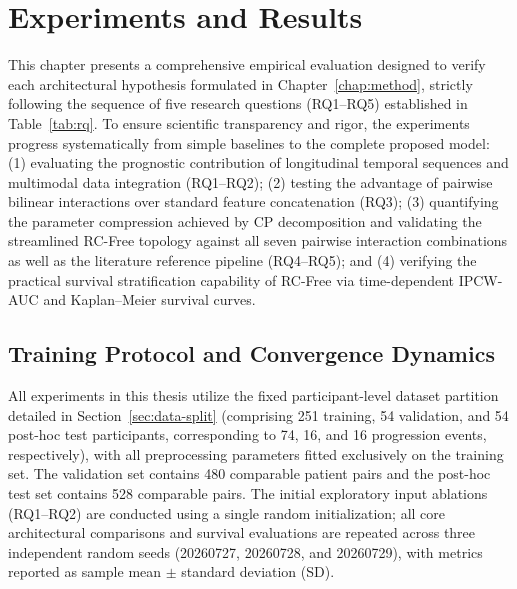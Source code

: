 \chapter{Experiments and Results}
\label{chap:results}

This chapter presents a comprehensive empirical evaluation designed to verify each architectural hypothesis formulated in Chapter~\ref{chap:method}, strictly following the sequence of five research questions (RQ1--RQ5) established in Table~\ref{tab:rq}. To ensure scientific transparency and rigor, the experiments progress systematically from simple baselines to the complete proposed model: (1) evaluating the prognostic contribution of longitudinal temporal sequences and multimodal data integration (RQ1--RQ2); (2) testing the advantage of pairwise bilinear interactions over standard feature concatenation (RQ3); (3) quantifying the parameter compression achieved by CP decomposition and validating the streamlined RC-Free topology against all seven pairwise interaction combinations as well as the literature reference pipeline (RQ4--RQ5); and (4) verifying the practical survival stratification capability of RC-Free via time-dependent IPCW-AUC and Kaplan--Meier survival curves.

\section{Training Protocol and Convergence Dynamics}
\label{sec:experimental-protocol}
All experiments in this thesis utilize the fixed participant-level dataset partition detailed in Section~\ref{sec:data-split} (comprising 251 training, 54 validation, and 54 post-hoc test participants, corresponding to 74, 16, and 16 progression events, respectively), with all preprocessing parameters fitted exclusively on the training set. The validation set contains 480 comparable patient pairs and the post-hoc test set contains 528 comparable pairs. The initial exploratory input ablations (RQ1--RQ2) are conducted using a single random initialization; all core architectural comparisons and survival evaluations are repeated across three independent random seeds (20260727, 20260728, and 20260729), with metrics reported as sample mean $\pm$ standard deviation (SD).

